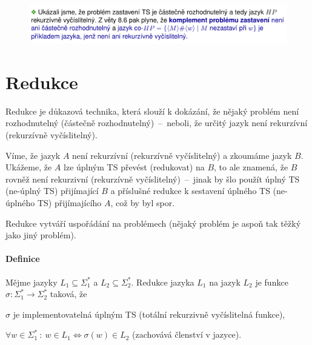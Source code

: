 \begin{figure}[H]
    \centering
    \includegraphics[width=1\linewidth]{diagonalizace_pr3_p4.pdf}
\end{figure}


\section{Redukce}

\begin{compactitem}
    \item Redukce je důkazová technika, která slouží k dokázání, že nějaký problém není rozhodnutelný (částečně rozhodnutelný)~--~neboli, že určitý jazyk není rekurzívní (rekurzívně vyčíslitelný). \begin{compactitem}
        \item Víme, že jazyk $A$ není rekurzívní (rekurzívně vyčíslitelný) a zkoumáme jazyk $B$. Ukážeme, že $A$ lze úplným TS převést (redukovat) na $B$, to ale znamená, že $B$ rovněž není rekurzivní (rekurzívně vyčíslitelný)~--~jinak by šlo použít úplný TS (ne-úplný TS) přijímající $B$ a příslušné redukce k sestavení úplného TS (ne-úplného TS) přijímajícího $A$, což by byl spor.
    \end{compactitem}

    \item Redukce vytváří uspořádání na problémech (nějaký problém je aspoň tak těžký jako jiný problém).

\end{compactitem}

\paragraph*{Definice} Mějme jazyky $L_1 \subseteq \Sigma_1^*$ a $L_2 \subseteq \Sigma_2^*$. Redukce jazyka $L_1$ na jazyk $L_2$ je funkce $\sigma : \Sigma_1^* \rightarrow \Sigma_2^*$ taková, že \begin{compactitem}
    \item $\sigma$ je implementovatelná úplným TS (totální rekurzivně vyčíslitelná funkce),
    \item $\forall w \in \Sigma_1^* ~:~ w \in L_1 \Leftrightarrow \sigma(w) \in L_2$ (zachovává členství v jazyce).
\end{compactitem}

